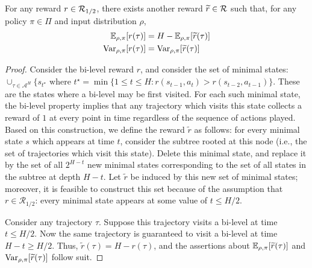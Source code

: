 \begin{lemma} \label{lemma:1-r}
For any reward $r \in {\mathcal{R}}_{1/2}$, there exists another reward $\widetilde{r} \in {\mathcal{R}}$ such that, for any policy $\pi \in \Pi$ and input distribution $\rho$,
\begin{align*}
    \mathbb{E}_{\rho, \pi} [r (\tau)] &= H -  \mathbb{E}_{\rho, \pi} [ \widetilde{r} (\tau)] \\
    \mathrm{Var}_{\rho,\pi} [ r (\tau) ] &= \mathrm{Var}_{\rho,\pi} [ \widetilde{r} (\tau) ]
\end{align*}
\end{lemma}
\begin{proof}
Consider the bi-level reward $r$, and consider the set of minimal states: $\cup_{\tau \in \mathcal{A}^H} \{ s_{t^\star} \text{ where } t^\star = \min \{ 1 \le t \le H : r(s_{t-1},a_t) > r(s_{t-2},a_{t-1}) \}$. These are the states where a bi-level may be first visited. For each such minimal state, the bi-level property implies that any trajectory which visits this state collects a reward of $1$ at every point in time regardless of the sequence of actions played. Based on this construction, we define the reward $\widetilde{r}$ as follows: for every minimal state $s$ which appears at time $t$, consider the subtree rooted at this node (i.e., the set of trajectories which visit this state). Delete this minimal state, and replace it by the set of all $2^{H-t}$ new minimal states corresponding to the set of all states in the subtree at depth $H-t$. Let $\widetilde{r}$ be induced by this new set of minimal states; moreover, it is feasible to construct this set because of the assumption that $r \in \mathcal{R}_{1/2}$: every minimal state appears at some value of $t \le H/2$.

Consider any trajectory $\tau$. Suppose this trajectory visits a bi-level at time $t \le H/2$. Now the same trajectory is guaranteed to visit a bi-level at time $H-t \ge H/2$. Thus, $\widetilde{r} (\tau) = H - r(\tau)$, and the assertions about $\mathbb{E}_{\rho,\pi} [\widetilde{r}(\tau)]$ and $\mathrm{Var}_{\rho,\pi} [ \widetilde{r} (\tau) ]$ follow suit.
\end{proof}






